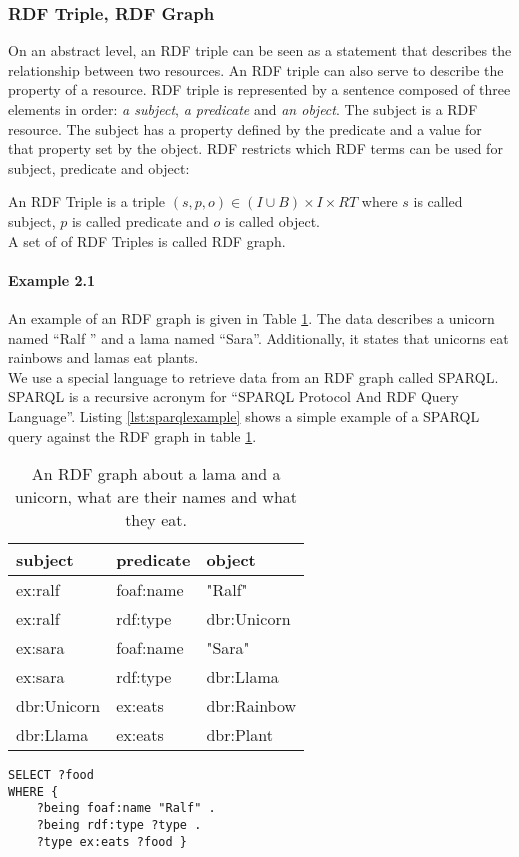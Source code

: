 \subsubsection{RDF Triple, RDF Graph} On an abstract level, an RDF triple can be seen as a statement that describes the relationship between two resources. An RDF triple can also serve to describe the property of a resource. RDF triple is represented by a sentence composed of three elements in order: \textit{a subject}, \textit{a predicate} and \textit{an object}.
The subject is a RDF resource. The subject has a property defined by the predicate and a value for that property set by the object.
RDF restricts which RDF terms can be used for subject, predicate and object:

\begin{definition}
An RDF Triple is a triple $(s, p, o) \in ( I \cup B ) \times I \times RT$ where $s$ is called subject, $p$ is called predicate and $o$ is called object. \\
A set of of RDF Triples is called RDF graph.
\end{definition}

\paragraph{Example 2.1}
An example of an RDF graph is given in Table \ref{tab:rdf_graph_example}. 
The data describes a unicorn named “Ralf ” and a lama named “Sara”. Additionally, it states that unicorns eat rainbows and lamas eat plants. \\

We use a special language to retrieve data from an RDF graph called SPARQL. SPARQL \cite{asd} is a recursive acronym for “SPARQL Protocol And RDF Query Language”. 
Listing \ref{lst:sparqlexample} shows a simple example of a SPARQL query
against the RDF graph in table \ref{tab:rdf_graph_example}. \\



\begin{table}[h]
	\centering
	\begin{tabular}{lll}
		\textbf{subject} & \textbf{predicate} & \textbf{object} \\ \hline
		ex:ralf          &        foaf:name            &          "Ralf"       \\
		ex:ralf          &        rdf:type           &       dbr:Unicorn          \\
		ex:sara			&          foaf:name          &          "Sara"       \\
		ex:sara         &            rdf:type        &           dbr:Llama   \\  
		dbr:Unicorn         &           ex:eats        &           dbr:Rainbow   \\  
		dbr:Llama      &            ex:eats      &          dbr:Plant  \\
	\end{tabular}
	\caption{An RDF graph about a lama and a unicorn, what are their names and what they eat.}
	\label{tab:rdf_graph_example}
\end{table}

\begin{lstlisting}[label={lst:sparqlexample},caption={An SPARQL query that returns what food Ralph eats.}]
SELECT ?food
WHERE { 
	?being foaf:name "Ralf" .
	?being rdf:type ?type .
	?type ex:eats ?food }
\end{lstlisting}
 
\clearpage